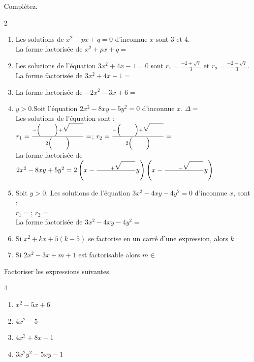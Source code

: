 \documentclass[main.tex]{subfiles}
\begin{document}
\begin{exercise} Complétez.
	\begin{spacing}{2}
	\begin{enumerate}[label=\alph*),leftmargin=*]
		\item Les solutions de $x^2+px+q=0$ d'inconnue $x$ sont $3$ et $4$.\\
		La forme   factorisée de $x^2+px+q=$\dotfill  
		\item Les solutions de l'équation $3x^2+4x-1=0$ sont $r_1=\frac{-2+\sqrt{7}}{3}$ et $r_2=\frac{-2-\sqrt{7}}{3}$.\\
		La forme factorisée de $3x^2+4x-1=$ \dotfill  
		\item  La forme factorisée de $-2x^2-3x+6=$ \dotfill 
		\item $y>0$.Soit l'équation $2x^2-8xy-5y^2=0$ d'inconnue $x$. $\Delta=$\dotfill  \\
		Les solutions de l'équation sont :\\ $r_1=\frac{-\left(\qquad\rule{0pt}{1.1em}\right)+\sqrt{\qquad\rule{0pt}{1.1em}}}{2\left(\qquad\rule{0pt}{1.1em}\right)}=$\dotfill; 
		$r_2=\frac{-\left(\qquad\rule{0pt}{1.1em}\right)+\sqrt{\qquad\rule{0pt}{1.1em}}}{2\left(\qquad\rule{0pt}{1.1em}\right)}=$\dotfill\\
		La forme factorisée de $2x^2-8xy+5y^2=2\left(x-\frac{\qquad+\sqrt{\rule{0pt}{1.1em}\qquad}}{\qquad\rule{0pt}{1.1em}}y\right)\left(x-\frac{\qquad-\sqrt{\rule{0pt}{1.1em}\qquad}}{\qquad\rule{0pt}{1.1em}}y\right)$
		\item Soit $y>0$. Les solutions de l'équation $3x^2-4xy-4y^2=0$ d'inconnue $x$, sont :\\ 
		$r_1= $\dotfill; 
		$r_2= $\dotfill \\
		La forme factorisée de $3x^2-4xy-4y^2=$ \dotfill 
		\item Si $x^2+kx+5(k-5)$ se factorise en un carré d'une expression, alors $k=$   \dotfill  
		\item Si $2x^2-3x+m+1$ est factorisable alors $m\in$   \dotfill 
	\end{enumerate} 
\end{spacing}\vspace{-1em}
\end{exercise} 
\begin{exercise}[renforcement]\label{chapitre03:exercice:factorisationparresolution:01} Factoriser les expressions suivantes.
	\vspace{-1em}
	\begin{multicols}{4}
		\begin{enumerate}[label={$f_{\arabic*}=$}, leftmargin=*]
			\item $x^2-5x+6$ 
			\item $4x^2-5$ 
			\item $4x^2+8x-1$ 
			\item $3x^2y^2-5xy-1$ 
		\end{enumerate}
	\end{multicols}  
\end{exercise} 
\end{document}
